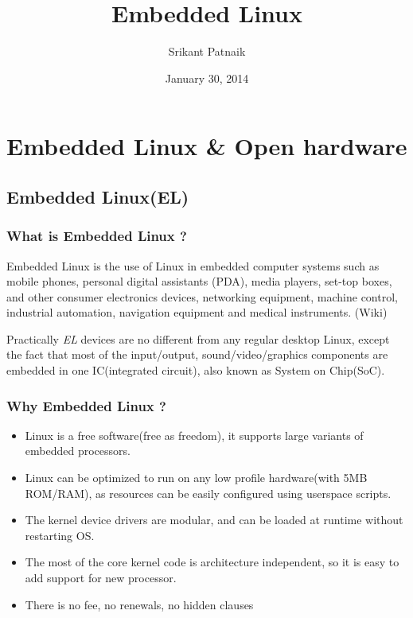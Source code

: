 \documentclass[letterpaper,10pt,english]{sphinxmanual}
\title{Embedded Linux}
\date{January 30, 2014}
\author{Srikant Patnaik}
\begin{document}
\maketitle
\tableofcontents
{}\label{index::doc}



\part{Embedded Linux \& Open hardware}
\label{embedded-linux:embedded-linux}\label{embedded-linux::doc}\label{embedded-linux:embedded-linux-open-hardware}

\chapter{Embedded Linux(EL)}
\label{embedded-linux:embedded-linux-el}

\section{What is Embedded Linux ?}
\label{embedded-linux:what-is-embedded-linux}
Embedded Linux is the use of Linux in embedded computer systems such as mobile
phones, personal digital assistants (PDA), media players, set-top boxes, and
other consumer electronics devices, networking equipment, machine control,
industrial automation, navigation equipment and medical instruments. (Wiki)

Practically \emph{EL} devices are no different from any regular desktop Linux,
except the fact that most of the input/output, sound/video/graphics components
are embedded in one IC(integrated circuit), also known as System on Chip(SoC).


\section{Why Embedded Linux ?}
\label{embedded-linux:why-embedded-linux}\begin{itemize}
\item {} 
Linux is a free software(free as freedom), it supports large variants of
embedded processors.

\item {} 
Linux can be optimized to run on any low profile hardware(with 5MB ROM/RAM),
as resources can be easily configured using userspace scripts.

\item {} 
The kernel device drivers are modular, and can be loaded at runtime without restarting OS.

\item {} 
The most of the core kernel code is architecture independent, so it is easy to add support for
new processor.

\item {} 
There is no fee, no renewals, no hidden clauses

\end{itemize}
\end{document}
